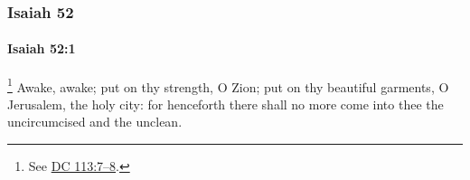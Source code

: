 	\subsubsection{Isaiah 52} %
		\label{ISAIAH-52}

		\paragraph{Isaiah 52:1} %
			\label{ISAIAH-52-1}

				\footnote{%
					See \hyperref[DC113-7]{DC 113:7--8}.
					}%
			Awake, awake; put on thy strength, O Zion; put on thy beautiful garments, O Jerusalem, the holy city: for henceforth there shall no more come into thee the uncircumcised and the unclean.


